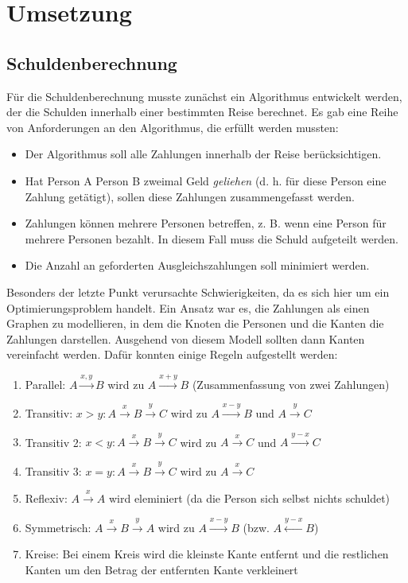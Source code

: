 \section {Umsetzung}

\subsection{Schuldenberechnung}

Für die Schuldenberechnung musste zunächst ein Algorithmus entwickelt werden, der die Schulden innerhalb einer bestimmten Reise berechnet.
Es gab eine Reihe von Anforderungen an den Algorithmus, die erfüllt werden mussten:

\begin{itemize}
\item Der Algorithmus soll alle Zahlungen innerhalb der Reise berücksichtigen.
\item Hat Person A Person B zweimal Geld \emph{geliehen} (d. h. für diese Person eine Zahlung getätigt), sollen diese Zahlungen zusammengefasst werden.
\item Zahlungen können mehrere Personen betreffen, z. B. wenn eine Person für mehrere Personen bezahlt. In diesem Fall muss die Schuld aufgeteilt werden.
\item Die Anzahl an geforderten Ausgleichszahlungen soll minimiert werden.
\end{itemize}

Besonders der letzte Punkt verursachte Schwierigkeiten, da es sich hier um ein Optimierungsproblem handelt.
Ein Ansatz war es, die Zahlungen als einen Graphen zu modellieren, in dem die Knoten die Personen und die Kanten die Zahlungen darstellen.
Ausgehend von diesem Modell sollten dann Kanten vereinfacht werden. Dafür konnten einige Regeln aufgestellt werden:

\begin{enumerate}
    \item Parallel: $A \xrightarrow{x, y} B$ wird zu $A \xrightarrow{x+y} B$ (Zusammenfassung von zwei Zahlungen)
    \item Transitiv: $x>y:A \xrightarrow{x} B \xrightarrow{y} C$ wird zu $A \xrightarrow{x-y} B$ und $A \xrightarrow{y} C$
    \item Transitiv 2: $x<y:A \xrightarrow{x} B \xrightarrow{y} C$ wird zu $A \xrightarrow{x} C$ und $A \xrightarrow{y-x} C$
    \item Transitiv 3: $x=y:A \xrightarrow{x} B \xrightarrow{y} C$ wird zu $A \xrightarrow{x} C$
    \item Reflexiv: $A \xrightarrow{x} A$ wird eleminiert (da die Person sich selbst nichts schuldet)
    \item Symmetrisch: $A \xrightarrow{x} B \xrightarrow{y} A$ wird zu $A \xrightarrow{x-y} B$ (bzw. $A \xleftarrow{y-x} B$)
    \item Kreise: Bei einem Kreis wird die kleinste Kante entfernt und die restlichen Kanten um den Betrag der entfernten Kante verkleinert
\end{enumerate}

